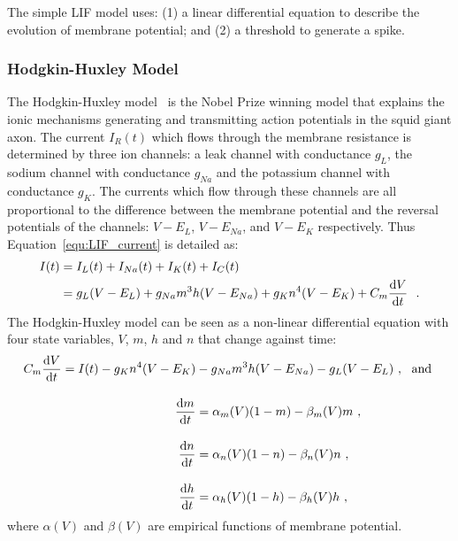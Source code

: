 The simple LIF model uses: (1) a linear differential equation to describe the evolution of membrane potential;
and (2) a threshold to generate a spike.

\subsubsection{Hodgkin-Huxley Model}
The Hodgkin-Huxley model~\citep{hodgkin1952quantitative} is the Nobel Prize winning model that explains the ionic mechanisms generating and transmitting action potentials in the squid giant axon.
The current $I_R(t)$ which flows through the membrane resistance is determined by three ion channels: a leak channel with conductance $g_L$, the sodium channel with conductance $g_{Na}$ and the potassium channel with conductance $g_{K}$.
The currents which flow through these channels are all proportional to the difference between the membrane potential and the reversal potentials of the channels: $V-E_L$, $V-E_{Na}$, and $V-E_{K}$ respectively.
Thus Equation~\ref{equ:LIF_current} is detailed as:
\begin{equation}
\begin{aligned}
I(t) &= I_L(t) + I_{Na}(t) + I_{K}(t)+ I_C(t) \\
&= g_L(V-E_L) + g_{Na}m^3h(V-E_{Na}) + g_{K}n^4(V-E_{K})  + C_m \dfrac{\mathrm{d} V}{\mathrm{d} t}~~.
\end{aligned}
\label{equ:HH_current}
\end{equation}
The Hodgkin-Huxley model can be seen as a non-linear differential equation with four state variables, $V$, $m$, $h$ and $n$ that change against time:
\begin{equation}
\begin{aligned}
C_m \dfrac{\mathrm{d} V}{\mathrm{d} t} = I(t) - g_{K}n^4(V-E_{K}) &- g_{Na}m^3h(V-E_{Na}) - g_L(V-E_L)~, \textrm{~~and }\\[10pt]
\dfrac{\mathrm{d} m}{\mathrm{d} t} &= \alpha_m(V)(1-m) - \beta_m(V)m~, \\[10pt]
\dfrac{\mathrm{d} n}{\mathrm{d} t} &= \alpha_n(V)(1-n) - \beta_n(V)n~, \\[10pt]
\dfrac{\mathrm{d} h}{\mathrm{d} t} &= \alpha_h(V)(1-h) - \beta_h(V)h~,
\end{aligned}
\end{equation} 
where $\alpha(V)$ and  $\beta(V)$ are empirical functions of membrane potential.

